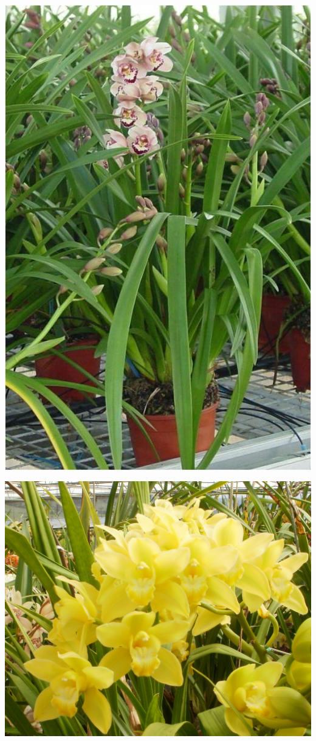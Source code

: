 \documentclass{article}
\begin{document}
\begin{center}
\includegraphics[width=0.9\textheight, angle=90]{../Cymbidium_Plant.jpg}
\end{center}
\newpage

\begin{center}
\includegraphics[width=0.9\textheight, angle=90]{../Cymbidium_Yellow.jpg}
\end{center}
\newpage
\end{document}
